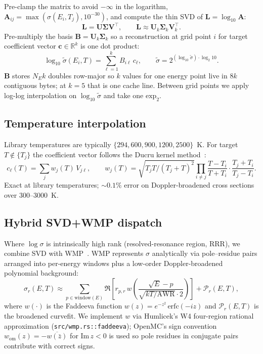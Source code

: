\documentclass[11pt,a4paper]{article}
\begin{document}
Pre-clamp the matrix to avoid $-\infty$ in the logarithm,
$\mathbf{A}_{ij} = \max(\sigma(E_i, T_j), 10^{-30})$, and
compute the thin SVD of $\mathbf{L} = \log_{10}\mathbf{A}$:
\begin{equation}
\mathbf{L} = \mathbf{U} \boldsymbol{\Sigma} \mathbf{V}^\top,
\qquad
\mathbf{L} \approx \mathbf{U}_k \boldsymbol{\Sigma}_k
\mathbf{V}_k^\top.
\end{equation}
Pre-multiply the basis $\mathbf{B} = \mathbf{U}_k
\boldsymbol{\Sigma}_k$ so a reconstruction at grid point $i$
for target coefficient vector $\mathbf{c} \in \mathbb{R}^k$ is
one dot product:
\begin{equation}
\log_{10}\tilde\sigma(E_i, T)
= \sum_{\ell = 1}^{k} B_{i\ell}\, c_\ell,
\qquad
\tilde\sigma = 2^{(\log_{10}\tilde\sigma)\cdot\log_2 10}.
\label{eq:svd_eval}
\end{equation}
$\mathbf{B}$ stores $N_E k$ doubles row-major so $k$ values
for one energy point live in $8k$ contiguous bytes; at $k=5$
that is one cache line. Between grid points we apply log-log
interpolation on $\log_{10}\tilde\sigma$ and take one
$\mathrm{exp}_2$.

\subsection{Temperature interpolation}
\label{sec:ducru}

Library temperatures are typically $\{294, 600, 900, 1200,
2500\}$~K. For target $T \not\in \{T_j\}$ the coefficient
vector follows the Ducru kernel method~\cite{ducru2017}:
\begin{equation}
c_\ell(T) = \sum_{j} w_j(T)\, V_{j\ell},
\qquad
w_j(T) = \sqrt{T_j T / (T_j + T)^2}
\prod_{i \neq j}
\frac{T - T_i}{T + T_i} \cdot \frac{T_j + T_i}{T_j - T_i}.
\label{eq:ducru}
\end{equation}
Exact at library temperatures; $\sim\!0.1\%$ error on
Doppler-broadened cross sections over $300$--$3000$~K.

\subsection{Hybrid SVD+WMP dispatch}

Where $\log \sigma$ is intrinsically high rank
(resolved-resonance region, RRR), we combine SVD with
WMP~\cite{josey2015wmp,forget2014wmp}. WMP represents $\sigma$
analytically via pole--residue pairs arranged into per-energy
windows plus a low-order Doppler-broadened polynomial
background:
\begin{equation}
\sigma_r(E, T) \approx \sum_{p \in \text{window}(E)}
\Re\!\left[
r_{p,r}\,
w\!\left(\frac{\sqrt{E} - p}{\sqrt{kT/\text{AWR}}\cdot 2}\right)
\right] + \mathcal{P}_r(E, T),
\end{equation}
where $w(\cdot)$ is the Faddeeva function
$w(z) = e^{-z^2}\,\mathrm{erfc}(-iz)$ and $\mathcal{P}_r(E, T)$
is the broadened curvefit. We implement $w$ via Humlicek's W4
four-region rational approximation
(\texttt{src/wmp.rs::faddeeva}); OpenMC's sign convention
$w_\text{om}(z) = -\overline{w(\bar z)}$ for
$\mathrm{Im}\,z < 0$ is used so pole residues in conjugate
pairs contribute with correct signs.
\end{document}
